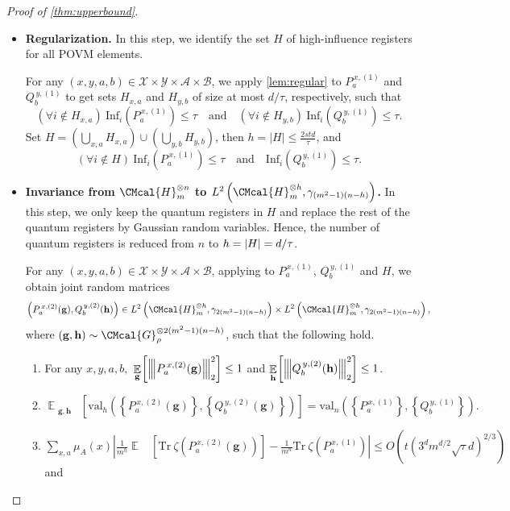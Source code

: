 \documentclass[10pt,a4paper]{article}
\def\G{\CMcal{G}}
\def\H{\CMcal{H}}
\theoremstyle{plain}
\theoremstyle{definition}
\newcommand {\minusspace} {\: \! \!}
\newcommand {\Fn} [2] {\ensuremath{ #1 \minusspace \Br{ #2 } }}
\newcommand {\set} [1] {\ensuremath{ \left\lbrace #1 \right\rbrace }}
\newcommand {\br} [1] {\ensuremath{ \left( #1 \right) }}
\newcommand {\Br} [1] {\ensuremath{ \left[ #1 \right] }}
\newcommand {\ab} [1] {\ensuremath{ \left| #1 \right| }}
\DeclarePairedDelimiter{\abs}{\lvert}{\rvert}
\DeclareMathOperator*{\bigE}{\mathbb{E}}
\newcommand {\expec} [2] {\Fn{\bigE_{\substack{#1}}}{#2}}
\newcommand{\nnorm}[1]{{\left\vert\kern-0.25ex\left\vert\kern-0.25ex\left\vert #1
		\right\vert\kern-0.25ex\right\vert\kern-0.25ex\right\vert}}
\newcommand {\Tr} {\ensuremath{ \mathrm{Tr} }}
\newcommand {\id} {\ensuremath{\mathds{1}}}
\newcommand{\randg}{\ensuremath{\mathbf{g}}}
\newcommand{\randh}{\ensuremath{\mathbf{h}}}
\newcommand{\herspace}[1]{\ensuremath{\H_m^{\otimes #1}}}
\newcommand{\infi}[1]{\ensuremath{\mathrm{Inf}_i}\br{#1}}
\newcommand{\gval}[3]{\ensuremath{\mathrm{val}_{#1}\br{\set{#2},\set{#3}}}}
\newcommand{\fourtuples}{\ensuremath{\br{x,y,a,b}\in\calX\times\calY\times\calA\times\calB}}
\newcommand{\Pnn}[1] {\ensuremath{{P^{\,x, (#1)}_a}}}
\newcommand{\Qnn}[1] {\ensuremath{{Q^{\,y, (#1)}_b}}}
\newcommand{\calX}{\mathcal{X}}
\newcommand{\calY}{\mathcal{Y}}
\newcommand{\calA}{\mathcal{A}}
\newcommand{\calB}{\mathcal{B}}
\newcommand{\1}{\mathbb{1}} %
\begin{document}
\begin{proof}[Proof of \cref{thm:upperbound}]
\begin{itemize}
     \begin{enumerate}
						\item For any $x,y,a,b$, $\Pnn{1}$ and $\Qnn{1}$ are of degree at most $d$.
\item For any $x,y,a,b$, $\displaystyle\nnorm{\Pnn{1}}_2\leq1~\mbox{and}~\nnorm{\Qnn{1}}_2\leq1.$
			\item $\ab{\gval{n}{\Pnn{1}}{\Qnn{1}}-\gval{n}{\Pnn{0}}{\Qnn{0}}}\leq\delta t^2,$
\item $\displaystyle\frac{1}{m^n}\sum_{x,a}\mu_A(x)\Tr~\zeta\br{\Pnn{1}}\leq\delta t $ and $\displaystyle\frac{1}{m^n}\sum_{y,b}\mu_B(y)\Tr~\zeta\br{\Qnn{1}}\leq\delta t. $
            \item For any $x,y$, $\displaystyle\sum_{a\in\calA}\Pnn{1}=\sum_{b\in\calB}\Qnn{1}=\id$.
		\end{enumerate}
     
\item \textbf{Regularization.}
In this step, we identify the set $H$ of high-influence registers for all POVM elements.

      For any \fourtuples, we apply \cref{lem:regular} to $\Pnn{1}$ and $\Qnn{1}$ to get sets $H_{x,a}$ and $H_{y,b}$ of size at most $d/\tau$, respectively, such that 
      \[\br{\forall i\notin H_{x,a}}~\infi{\Pnn{1}}\leq\tau\quad\mbox{and}\quad\br{\forall i\notin H_{y,b}}~\infi{\Qnn{1}}\leq\tau.\]
      Set $H=\br{\bigcup_{x,a}H_{x,a}}\cup\br{\bigcup_{y,b}H_{y,b}}$, then 
      $h=\ab{H}\leq\frac{2std}{\tau}$, and 
      \[\br{\forall i\notin H}~\infi{\Pnn{1}}\leq\tau\quad\mbox{and}\quad\infi{\Qnn{1}}\leq\tau.\]
      
\item \textbf{Invariance from \herspace{n} to $L^2\br{\herspace{h},\gamma_{(m^2-1)(n-h)}}$.}
In this step, we only keep the quantum registers in $H$ and replace 
the rest of the quantum registers by Gaussian random variables.
Hence, 
the number of quantum registers is reduced from $n$ to $h = \abs{H} = d/\tau$.


      For any \fourtuples, applying \cite[Lemma 10.5]{qin2021nonlocal} to $\Pnn{1}$, $\Qnn{1}$ and $H$, we obtain joint random matrices
      \[\br{\Pnn{2}(\randg),\Qnn{2}(\randh)}\in L^2\br{\herspace{h},\gamma_{2(m^2-1)(n-h)}}\times L^2\br{\herspace{h},\gamma_{2(m^2-1)(n-h)}},\]
      where $\br{\mathbf{g},\mathbf{h}}\sim\G_{\rho}^{\otimes2(m^2-1)(n-h)}$, such that the following hold.
      \begin{enumerate}
		\item For any $x,y,a,b,$ $\displaystyle\expec{\randg}{\nnorm{\Pnn{2}(\randg)}_2^2}\leq1$ and 		
		$\displaystyle\expec{\randh}{\nnorm{\Qnn{2}(\randh)}_2^2}\leq1$.
		\item $\expec{\randg,\randh}{\gval{h}{\Pnn{2}(\randg)}{\Qnn{2}(\randg)}}=\gval{n}{\Pnn{1}}{\Qnn{1}}.$
		\item $\displaystyle\sum_{x,a}\mu_A(x)\ab{\frac{1}{m^h}\expec{}{\Tr~\zeta\br{\Pnn{2}(\randg)}}-\frac{1}{m^n}\Tr~\zeta\br{\Pnn{1}}}\leq O\br{t\br{3^dm^{d/2}\sqrt{\tau}d}^{2/3}}$ and


\end{enumerate}
\end{itemize}
\end{proof}
\end{document}
